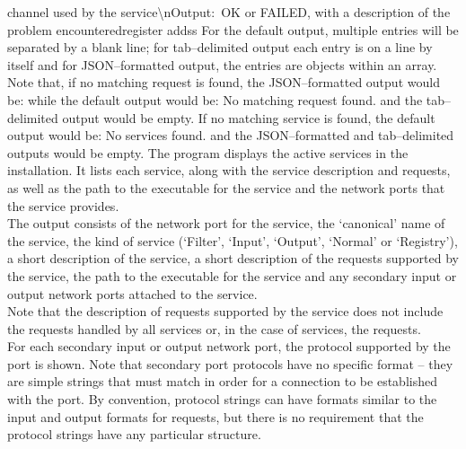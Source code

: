 channel used by the service\textbackslash{}nOutput:\ OK or FAILED, with a description of
the\\
problem encountered\pseudotab{}register add\pseudotab{}s\pseudotab{}s
\outputEnd{}
For the default output, multiple entries will be separated by a blank line; for
tab--delimited output each entry is on a line by itself and for JSON--formatted output,
the entries are objects within an array.
Note that, if no matching request is found, the JSON--formatted output would be:
\outputBegin{}
\sqPair
\outputEnd{}
\newpage
while the default output would be:
\outputBegin{}
No matching request found.
\outputEnd{}
and the tab--delimited output would be empty.
If no matching service is found, the default output would be:
\outputBegin{}
No services found.
\outputEnd{}
and the JSON--formatted and tab--delimited outputs would be empty.
The program  displays the active services in the \mplusm{}
installation.
It lists each service, along with the service description and requests, as well as the
path to the executable for the service and the \yarp{} network ports that the service
provides.\\

The output consists of the \yarp{} network port for the service, the `canonical' name of
the service, the kind of service (`Filter', `Input', `Output', `Normal' or `Registry'), a
short description of the service, a short description of the requests supported by the
service, the path to the executable for the service and any secondary input or output
\yarp{} network ports attached to the service.\\

Note that the description of requests supported by the service does not include the
 requests handled by all services or, in the case of
 services, the 
requests.\\

For each secondary input or output \yarp{} network port, the protocol supported by the
port is shown.
Note that secondary port protocols have no specific format -- they are simple strings that
must match in order for a connection to be established with the port.
By convention, protocol strings can have formats similar to the input and output formats
for requests, but there is no requirement that the protocol strings have any particular
structure.\\

